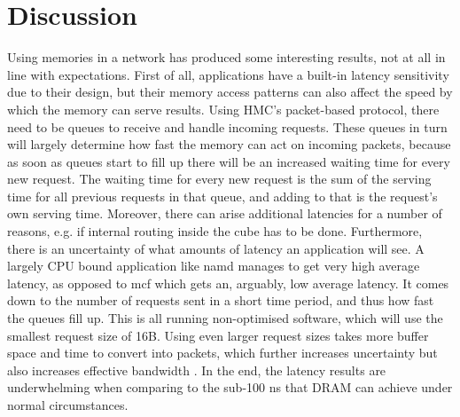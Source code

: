 \chapter{Discussion}
Using memories in a network has produced some interesting results, not at all in line with expectations. First of all, applications have a built-in latency sensitivity due to their design, but their memory access patterns can also affect the speed by which the memory can serve results. Using HMC's packet-based protocol, there need to be queues to receive and handle incoming requests. These queues in turn will largely determine how fast the memory can act on incoming packets, because as soon as queues start to fill up there will be an increased waiting time for every new request. The waiting time for every new request is the sum of the serving time for all previous requests in that queue, and adding to that is the request's own serving time. Moreover, there can arise additional latencies for a number of reasons, e.g. if internal routing inside the cube has to be done. Furthermore, there is an uncertainty of what amounts of latency an application will see. A largely CPU bound application like namd manages to get very high average latency, as opposed to mcf which gets an, arguably, low average latency. It comes down to the number of requests sent in a short time period, and thus how fast the queues fill up. This is all running non-optimised software, which will use the smallest request size of 16B. Using even larger request sizes takes more buffer space and time to convert into packets, which further increases uncertainty but also increases effective bandwidth \cite{8167757, 8366939}. In the end, the latency results are underwhelming when comparing to the sub-100 ns that DRAM can achieve under normal circumstances.
\bigskip

